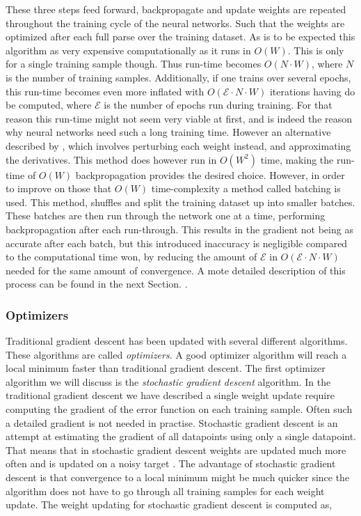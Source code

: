 
These three steps feed forward, backpropagate and update weights are repeated
throughout the training cycle of the neural networks. Such that the weights
are optimized after each full parse over the training dataset. As is to be
expected this algorithm as very expensive computationally as it runs in $O(W)$.
This is only for a single training sample though. Thus run-time becomes $O(N
\cdot W)$, where $N$ is the number of training samples. Additionally, if
one trains over several epochs, this run-time becomes even more inflated
with $O(\mathcal{E}\cdot N\cdot W)$ iterations having do be computed, where
$\mathcal{E}$ is the number of epochs run during training. For that reason
this run-time might not seem very viable at first, and is indeed the reason
why neural networks need such a long training time. However an alternative
described by \citet{Bishop}, which involves perturbing each weight instead, and
approximating the derivatives. This method does however run in $O(W^2)$ time,
making the run-time of $O(W)$ backpropagation provides the desired choice.
However, in order to improve on those that $O(W)$ time-complexity a method
called batching is used. This method, shuffles and split the training dataset
up into smaller batches. These batches are then run through the network one at
a time, performing backpropagation after each run-through. This results in the
gradient not being as accurate after each batch, but this introduced inaccuracy
is negligible compared to the computational time won, by reducing the amount of
$\mathcal{E}$ in $O(\mathcal{E}\cdot N\cdot W)$ needed for the same amount of
convergence. A mote detailed description of this process can be found in the
next Section. \citep{Bishop}.


\subsubsection{Optimizers}\label{sec:optimizers}

Traditional gradient descent has been updated with several different algorithms.
These algorithms are called \textit{optimizers}. A good optimizer algorithm
will reach a local minimum faster than traditional gradient descent. The first
optimizer algorithm we will discuss is the \textit{stochastic gradient descent}
algorithm. In the traditional gradient descent we have described a single
weight update require computing the gradient of the error function on each
training sample. Often such a detailed gradient is not needed in practise.
Stochastic gradient descent is an attempt at estimating the gradient of all
datapoints using only a single datapoint. That means that in stochastic gradient
descent weights are updated much more often and is updated on a noisy target
\citep{Bishop}. The advantage of stochastic gradient descent is that convergence
to a local minimum might be much quicker since the algorithm does not have to
go through all training samples for each weight update. The weight updating for
stochastic gradient descent is computed as,

